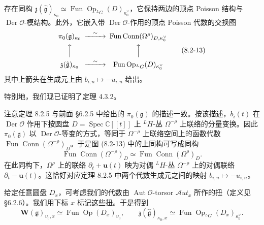 \begin{theorem}
    存在同构 $\mathfrak z(\hat{\mathfrak g})_{\kappa_0}\simeq\operatorname{Fun}\operatorname{Op}_{{}^LG}(D)_{\kappa^\vee_0}$，它保持两边的顶点 Poisson 结构与 $\operatorname{Der}\mathcal O$-模结构。此外，它嵌入带 $\operatorname{Der}\mathcal O$-作用的顶点 Poisson 代数的交换图
    \begin{equation}
    \begin{CD}
    \pi_0(\mathfrak g)_{\kappa_0} @>{\sim}>> \operatorname{Fun}\operatorname{Conn}(\Omega^{\rho})_{D,\kappa^\vee_0}\\
    @AAA @AAA\\
    \mathfrak z(\hat{\mathfrak g})_{\kappa_0} @>{\sim}>> \operatorname{Fun}\operatorname{Op}_{{}^LG}(D)_{\kappa^\vee_0}
    \end{CD}
    \tag{8.2-13}
    \end{equation}
    其中上箭头在生成元上由 $b_{i,n}\mapsto-u_{i,n}$ 给出。
\end{theorem}


特别地，我们现已证明了定理 4.3.2。

注意定理 8.2.5 与前面 §6.2.5 中给出的 $\pi_0(\mathfrak g)$ 的描述一致。按该描述，$b_i(t)$ 在 $\operatorname{Der}\mathcal O$ 作用下按圆盘 $D=\operatorname{Spec}\mathbb C[\![t]\!]$ 上 ${}^LH$-丛 $\Omega^{-\rho}$ 上联络的分量变换。因此 $\pi_0(\mathfrak g)$ 以 $\operatorname{Der}\mathcal O$-等变的方式，等同于 $\Omega^{-\rho}$ 上联络空间上的函数代数 $\operatorname{Fun}\operatorname{Conn}(\Omega^{-\rho})_D$。于是图 (8.2-13) 中的上同构可写成同构
\begin{equation}
    \operatorname{Fun}\operatorname{Conn}(\Omega^{-\rho})_D\simeq\operatorname{Fun}\operatorname{Conn}(\Omega^{\rho})_D.
    \tag{8.2-14}
\end{equation}
在此同构下，$\Omega^{\rho}$ 上的联络 $\partial_t+\mathbf u(t)$ 映为对偶 ${}^LH$-丛 $\Omega^{-\rho}$ 上的对偶联络 $\partial_t-\mathbf u(t)$。这恰好对应定理 8.2.5 中两个代数生成元之间的映射 $b_{i,n}\mapsto-u_{i,n}$。

给定任意圆盘 $D_x$，可考虑我们的代数由 $\operatorname{Aut}\mathcal O$-torsor $\mathcal Aut_x$ 所作的扭（定义见 §6.2.6）。我们用下标 $x$ 标记这些扭。于是得到
\[
    \mathbf W(\mathfrak g)_{\upsilon_0,x}\simeq\operatorname{Fun}\operatorname{Op}(D_x)_{\upsilon_0},
    \qquad
    \mathfrak z(\hat{\mathfrak g})_{\kappa_0,x}\simeq\operatorname{Fun}\operatorname{Op}_{{}^LG}(D_x)_{\kappa^\vee_0}.
\]

